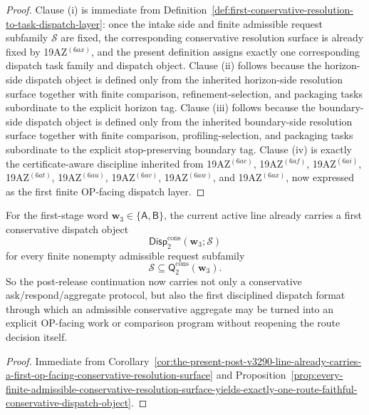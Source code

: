 \begin{proof}
Clause (i) is immediate from Definition~\ref{def:first-conservative-resolution-to-task-dispatch-layer}: once the intake side and finite admissible request subfamily \(\mathcal S\) are fixed, the corresponding conservative resolution surface is already fixed by 19AZ$^{(6ax)}$, and the present definition assigns exactly one corresponding dispatch task family and dispatch object. Clause (ii) follows because the horizon-side dispatch object is defined only from the inherited horizon-side resolution surface together with finite comparison, refinement-selection, and packaging tasks subordinate to the explicit horizon tag. Clause (iii) follows because the boundary-side dispatch object is defined only from the inherited boundary-side resolution surface together with finite comparison, profiling-selection, and packaging tasks subordinate to the explicit stop-preserving boundary tag. Clause (iv) is exactly the certificate-aware discipline inherited from 19AZ$^{(6ae)}$, 19AZ$^{(6af)}$, 19AZ$^{(6ai)}$, 19AZ$^{(6at)}$, 19AZ$^{(6au)}$, 19AZ$^{(6av)}$, 19AZ$^{(6aw)}$, and 19AZ$^{(6ax)}$, now expressed as the first finite OP-facing dispatch layer.
\end{proof}

\begin{corollary}
\label{cor:the-present-post-v3290-line-already-carries-a-first-conservative-dispatch-object}
For the first-stage word \(\mathbf w_3\in\{\mathsf A,\mathsf B\}\), the current active line already carries a first conservative dispatch object
\[
 \mathsf{Disp}^{\mathrm{cons}}_{2}(\mathbf w_3;\mathcal S)
\]
for every finite nonempty admissible request subfamily
\[
 \mathcal S\subseteq \mathsf{Q}^{\mathrm{cons}}_{2}(\mathbf w_3).
\]
So the post-release continuation now carries not only a conservative ask/respond/aggregate protocol, but also the first disciplined dispatch format through which an admissible conservative aggregate may be turned into an explicit OP-facing work or comparison program without reopening the route decision itself.
\end{corollary}

\begin{proof}
Immediate from Corollary~\ref{cor:the-present-post-v3290-line-already-carries-a-first-op-facing-conservative-resolution-surface} and Proposition~\ref{prop:every-finite-admissible-conservative-resolution-surface-yields-exactly-one-route-faithful-conservative-dispatch-object}.
\end{proof}

